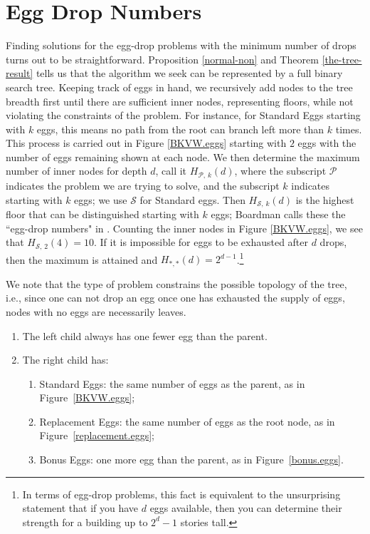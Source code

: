 \documentclass[12pt]{amsart}
\theoremstyle{definition}
\theoremstyle{theorem}
\begin{document}
\section{Egg Drop Numbers}\label{section.edn}
Finding solutions for the egg-drop problems with the minimum number of drops turns out to be straightforward. 
Proposition \ref{normal-non} and Theorem \ref{the-tree-result}
tells us that the algorithm we seek can be represented by a full binary search tree. 
Keeping track of eggs in hand, we recursively add nodes to the tree 
breadth first until there are sufficient inner nodes, 
representing  floors, while not violating the 
constraints of the problem.
For instance, for Standard Eggs starting with $k$ eggs, this 
means no path from the root can branch left more than $k$ times.
This process is carried out in Figure  \ref{BKVW.eggs} starting with $2$ eggs with the
number of eggs remaining  shown at each node.
We then determine the maximum number of inner nodes for depth $d$, call it $H_{{\mathcal P},\,k}(d)$,
where the subscript $\mathcal P$ indicates the problem we are trying to solve, and the subscript $k$
indicates starting with $k$ eggs; we use $\mathcal S$ for Standard eggs.
Then $H_{{\mathcal S},\,k}(d)$ is the highest floor that can be distinguished starting with $k$ eggs; Boardman calls these the ``egg-drop numbers" in \cite{BoardEgg}.
Counting the inner nodes in  Figure  \ref{BKVW.eggs}, we see that $H_{{\mathcal S},\,2}(4)=10.$ 
If it is impossible for eggs to be exhausted after $d$ drops, then the maximum is attained and $H_{*,*}(d)=2^{d-1}$.\footnote{In terms of egg-drop problems, this fact is equivalent to the unsurprising statement that if you have $d$ eggs available, then you can determine their strength for a building up to $2^d-1$ stories tall.}

We note that the type of problem constrains the possible topology of the tree, i.e., since one can not drop
an egg once one has exhausted the supply of eggs, nodes with no eggs are necessarily leaves. 
\begin{enumerate}
	\item The left child always has one fewer egg than the parent.
	\item The right child has:
	\begin{enumerate}
	\item Standard  Eggs: the same number of eggs as the parent, as in Figure~\ref{BKVW.eggs};
	\item Replacement Eggs: the same number of eggs as the root node, as in Figure~\ref{replacement.eggs};
	\item Bonus Eggs: one more egg than the parent, as in Figure~\ref{bonus.eggs}.
	\end{enumerate}
\end{enumerate}
\end{document}
